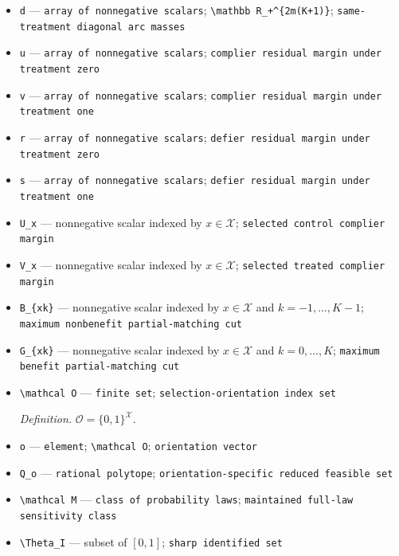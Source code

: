 \documentclass{article}
\begin{document}
\begin{itemize}
  \item \texttt{d} --- \texttt{array of nonnegative scalars}; \texttt{\textbackslash{}\allowbreak{}mathbb R\_\allowbreak{}+\allowbreak{}\textasciicircum{}\{2m(K+\allowbreak{}1)\}\allowbreak{}}; \texttt{same-\allowbreak{}treatment diagonal arc masses}
  \item \texttt{u} --- \texttt{array of nonnegative scalars}; \texttt{complier residual margin under treatment zero}
  \item \texttt{v} --- \texttt{array of nonnegative scalars}; \texttt{complier residual margin under treatment one}
  \item \texttt{r} --- \texttt{array of nonnegative scalars}; \texttt{defier residual margin under treatment zero}
  \item \texttt{s} --- \texttt{array of nonnegative scalars}; \texttt{defier residual margin under treatment one}
  \item \texttt{U\_\allowbreak{}x} --- nonnegative scalar indexed by \(x\in\mathcal X\); \texttt{selected control complier margin}
  \item \texttt{V\_\allowbreak{}x} --- nonnegative scalar indexed by \(x\in\mathcal X\); \texttt{selected treated complier margin}
  \item \texttt{B\_\allowbreak{}\{xk\}\allowbreak{}} --- nonnegative scalar indexed by \(x\in\mathcal X\) and \(k=-1,\ldots,K-1\); \texttt{maximum nonbenefit partial-\allowbreak{}matching cut}
  \item \texttt{G\_\allowbreak{}\{xk\}\allowbreak{}} --- nonnegative scalar indexed by \(x\in\mathcal X\) and \(k=0,\ldots,K\); \texttt{maximum benefit partial-\allowbreak{}matching cut}
  \item \texttt{\textbackslash{}\allowbreak{}mathcal O} --- \texttt{finite set}; \texttt{selection-\allowbreak{}orientation index set}
  \par\smallskip\noindent\emph{Definition.} \(\mathcal O=\{0,1\}^{\mathcal X}\).
  \item \texttt{o} --- \texttt{element}; \texttt{\textbackslash{}\allowbreak{}mathcal O}; \texttt{orientation vector}
  \item \texttt{Q\_\allowbreak{}o} --- \texttt{rational polytope}; \texttt{orientation-\allowbreak{}specific reduced feasible set}
  \item \texttt{\textbackslash{}\allowbreak{}mathcal M} --- \texttt{class of probability laws}; \texttt{maintained full-\allowbreak{}law sensitivity class}
  \item \texttt{\textbackslash{}\allowbreak{}Theta\_\allowbreak{}I} --- subset of \([0,1]\); \texttt{sharp identified set}

\end{itemize}
\end{document}
